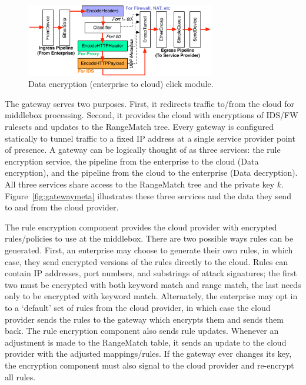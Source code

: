 \begin{figure}[t]
  \centering
  \includegraphics[width=3.25in]{fig/gatewaydiag}
  \caption[]{\label{fig:gateway} Data encryption (enterprise to cloud) click module.}
\end{figure}

The gateway serves two purposes. First, it redirects traffic to/from the cloud for middlebox processing. Second, it provides the cloud with encryptions of IDS/FW rulesets and updates to the RangeMatch tree.
Every gateway is configured statically to tunnel traffic to a fixed IP address at a single service provider point of presence.
A gateway can be logically thought of as three services: the rule encryption service, the pipeline from the enterprise to the cloud (Data encryption), and the pipeline from the cloud to the enterprise (Data decryption). 
All three services share access to the RangeMatch tree and the private key $k$.
Figure~\ref{fig:gatewaymeta} illustrates  these three services and the data they send to and from the cloud provider.

 The rule encryption component provides the cloud provider with encrypted rules/policies to use at the middlebox. 
There are two possible ways rules can be generated. First, an enterprise may choose to generate their own rules, in which case, they send encrypted versions of the rules directly to the cloud.
Rules can contain IP addresses, port numbers, and substrings of attack signatures; the first two must be encrypted with both keyword match and range match, the last needs only to be encrypted with keyword match.
Alternately, the enterprise may opt in to a `default' set of rules from the cloud provider, in which case the cloud provider sends the rules to the gateway which encrypts them and sends them back.
The rule encryption component also sends rule updates. Whenever an adjustment is made to the RangeMatch table, it sends an update to the cloud provider with the adjusted mappings/rules.
If the gateway ever changes its key, the encryption component must also signal to the cloud provider and re-encrypt all rules.

